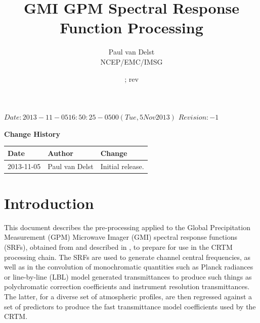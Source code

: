 



\SVN $Date: 2013-11-05 16:50:25 -0500 (Tue, 5 Nov 2013) $
\SVN $Revision: -1 $

\title{GMI GPM Spectral Response Function Processing}
\author{Paul van Delst\\NCEP/EMC/IMSG}
\date{\SVNDate ; rev\SVNRevision}



\maketitle

\draftwatermark

\thispagestyle{empty}
\vspace*{10cm}
\begin{center}
  {\sffamily\Large\bfseries Change History}
  \begin{table}[htp]
    \centering
    \begin{tabular}{|p{2cm}|p{3cm}|p{8cm}|}
      \hline
      \sffamily\textbf{Date} & \sffamily\textbf{Author} & \sffamily\textbf{Change}\\
      \hline\hline
      2013-11-05 & Paul van Delst & Initial release.\\
      \hline
    \end{tabular}
  \end{table}
\end{center}
\clearpage
\pagestyle{fancy}
\fancyhead[LE,RO]{\sffamily \rightmark}
\fancyhead[LO,RE]{\sffamily \leftmark}
\setcounter{page}{1}



\section{Introduction}
This document describes the pre-processing applied to the Global Precipitation Measurement (GPM) Microwave Imager (GMI) spectral response functions (SRFs), obtained from \cite{GMI_SRF_Data} and described in \citet{GMI_SER}, to prepare for use in the CRTM processing chain. The SRFs are used to generate channel central frequencies, as well as in the convolution of monochromatic quantities such as Planck radiances or line-by-line (LBL) model generated transmittances to produce such things as polychromatic correction coefficients and instrument resolution transmittances. The latter, for a diverse set of atmospheric profiles, are then regressed against a set of predictors to produce the fast transmittance model coefficients used by the CRTM.

